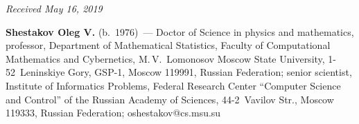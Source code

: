 
\hfill{\small\textit{Received May 16, 2019}}




\Contrl

\noindent
\textbf{Shestakov Oleg V.} (b.\ 1976)~--- 
Doctor of Science in physics and mathematics, professor, Department 
of Mathematical Statistics, Faculty of Computational Mathematics 
and Cybernetics, M.\,V.~Lomonosov Moscow State University, 1-52~Leninskiye Gory,
 GSP-1, Moscow 119991, Russian Federation; 
 senior scientist, Institute of Informatics Problems, Federal Research Center 
 ``Computer Science and Control'' of the Russian Academy of Sciences, 
 44-2~Vavilov Str., Moscow 119333, Russian Federation; \mbox{oshestakov@cs.msu.su}
\label{end\stat}

\renewcommand{\bibname}{\protect\rm Литература}  